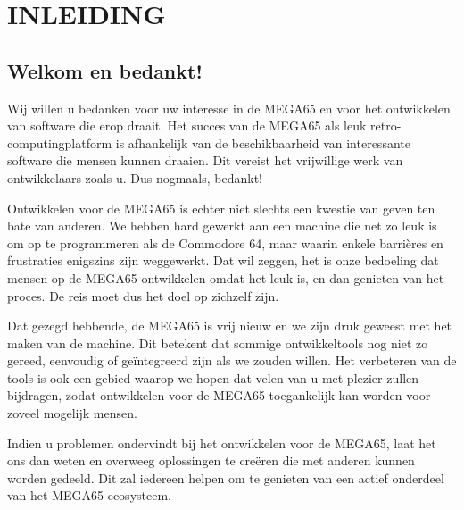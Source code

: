 







\cleardoublepage

\part{INLEIDING}

\chapter{Welkom en bedankt!}

Wij willen u bedanken voor uw interesse in de MEGA65
en voor het ontwikkelen van software die erop draait. Het succes van de MEGA65 als
leuk retro-computingplatform is afhankelijk van de beschikbaarheid van
interessante software die mensen kunnen draaien. Dit vereist het
vrijwillige werk van ontwikkelaars zoals u. Dus nogmaals, bedankt!

Ontwikkelen voor de MEGA65 is echter niet slechts een kwestie van geven ten
bate van anderen. We hebben hard gewerkt aan een machine die net zo
leuk is om op te programmeren als de Commodore 64, maar waarin enkele barrières
en frustraties enigszins zijn weggewerkt. Dat wil zeggen, het is onze bedoeling
dat mensen op de MEGA65 ontwikkelen omdat het leuk is, en dan genieten van
het proces. De reis moet dus het doel op zichzelf zijn.

Dat gezegd hebbende, de MEGA65 is vrij nieuw en we zijn druk geweest met
het maken van de machine. Dit betekent dat sommige ontwikkeltools nog
niet zo gereed, eenvoudig of geïntegreerd zijn als we zouden willen. Het verbeteren
van de tools is ook een gebied waarop we hopen dat velen van u met plezier
zullen bijdragen, zodat ontwikkelen voor de MEGA65 toegankelijk kan worden
voor zoveel mogelijk mensen.

Indien u problemen ondervindt bij het
ontwikkelen voor de MEGA65, laat het ons dan weten en
overweeg oplossingen te creëren die met anderen kunnen worden gedeeld. Dit zal
iedereen helpen om te genieten van een actief onderdeel van het MEGA65-ecosysteem.

